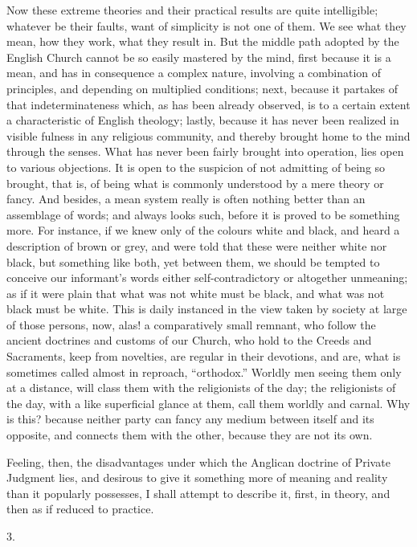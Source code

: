 Now these extreme theories and their practical results are quite
intelligible; whatever be their faults, want of simplicity is not one
of them. We see what they mean, how they work, what they result in.
But the middle path adopted by the English Church cannot be so easily
mastered by the mind, first because it is a mean, and has in
consequence a complex nature, involving a combination of principles,
and depending on multiplied conditions; next, because it partakes of
that indeterminateness which, as has been already observed, is to a
certain extent a characteristic of English theology; lastly, because
it has never been realized in visible fulness in any religious
community, and thereby brought home to the mind through the senses.
What has never been fairly brought into operation, lies open to
various objections. It is open to the suspicion of not admitting of
being so brought, that is, of being what is commonly understood by a
mere theory or fancy. And besides, a mean system really is often
nothing better than an assemblage of words; and always looks such,
before it is proved to be something more. For instance, if we knew
only of the colours white and black, and heard a description of brown
or grey, and were told that these were neither white nor black, but
something like both, yet between them, we should be tempted to
conceive our informant's words either self-contradictory or altogether
unmeaning; as if it were plain that what was not white must be black,
and what was not black must be white. This is daily instanced in the
view taken by society at large of those persons, now, alas! a
comparatively small remnant, who follow the ancient doctrines and
customs of our Church, who hold to the Creeds and Sacraments, keep
from novelties, are regular in their devotions, and are, what is
sometimes called almost in reproach, ``orthodox.'' Worldly men
seeing them only at a distance, will class them with the religionists
of the day; the religionists of the day, with a like superficial
glance at them, call them worldly and carnal. Why is this? because
neither party can fancy any medium between itself and its opposite,
and connects them with the other, because they are not its own.

Feeling, then, the disadvantages under which the Anglican doctrine
of Private Judgment lies, and desirous to give it something more of
meaning and reality than it popularly possesses, I shall attempt to
describe it, first, in theory, and then as if reduced to practice.

3.

